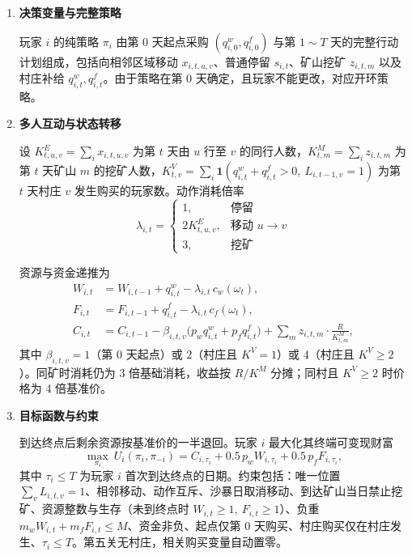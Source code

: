 \documentclass{cumcmthesis}
\numberwithin{equation}{section}
\numberwithin{figure}{section}
\numberwithin{table}{section}
\begin{document}
\begin{enumerate}
    \item \textbf{决策变量与完整策略}
    
\hspace*{2em}玩家 $i$ 的纯策略 $\pi_i$ 由第 0 天起点采购 $(q^w_{i,0},q^f_{i,0})$ 与第 $1\sim T$ 天的完整行动计划组成，包括向相邻区域移动 $x_{i,t,u,v}$、普通停留 $s_{i,t}$、矿山挖矿 $z_{i,t,m}$ 以及村庄补给 $q^w_{i,t},q^f_{i,t}$。由于策略在第 0 天确定，且玩家不能更改，对应开环策略。

    \item \textbf{多人互动与状态转移}

\hspace*{2em}设 $K^E_{t,u,v}=\sum_i x_{i,t,u,v}$ 为第 $t$ 天由 $u$ 行至 $v$ 的同行人数，$K^M_{t,m}=\sum_i z_{i,t,m}$ 为第 $t$ 天矿山 $m$ 的挖矿人数，$K^V_{t,v}=\sum_i\mathbf{1}(q^w_{i,t}+q^f_{i,t}>0,\ L_{i,t-1,v}=1)$ 为第 $t$ 天村庄 $v$ 发生购买的玩家数。动作消耗倍率
\vspace{-10pt}
\begin{equation}
\lambda_{i,t}=\begin{cases}
1, & \text{停留} \\
2K^E_{t,u,v}, & \text{移动 }u\to v \\
3, & \text{挖矿}
\end{cases}
\end{equation}

\hspace*{2em}资源与资金递推为
\vspace{-10pt}
\begin{equation}
\begin{aligned}
W_{i,t}&=W_{i,t-1}+q^w_{i,t}-\lambda_{i,t}\,c_w(\omega_t), \\
F_{i,t}&=F_{i,t-1}+q^f_{i,t}-\lambda_{i,t}\,c_f(\omega_t), \\
C_{i,t}&=C_{i,t-1}-\beta_{i,t,v}\bigl(p_w q^w_{i,t}+p_f q^f_{i,t}\bigr)+\sum_m z_{i,t,m}\cdot\frac{R}{K^M_{t,m}},
\end{aligned}
\end{equation}
其中 $\beta_{i,t,v}=1$（第 0 天起点）或 $2$（村庄且 $K^V=1$）或 $4$（村庄且 $K^V\ge2$）。同矿时消耗仍为 3 倍基础消耗，收益按 $R/K^M$ 分摊；同村且 $K^V\ge2$ 时价格为 4 倍基准价。

    \item \textbf{目标函数与约束}

\hspace*{2em}到达终点后剩余资源按基准价的一半退回。玩家 $i$ 最大化其终端可变现财富
\vspace{-10pt}
\begin{equation}
\max_{\pi_i}\ U_i(\pi_i,\pi_{-i})=C_{i,\tau_i}+0.5\,p_w W_{i,\tau_i}+0.5\,p_f F_{i,\tau_i},
\end{equation}
其中 $\tau_i\le T$ 为玩家 $i$ 首次到达终点的日期。约束包括：唯一位置 $\sum_v L_{i,t,v}=1$、相邻移动、动作互斥、沙暴日取消移动、到达矿山当日禁止挖矿、资源整数与生存（未到终点时 $W_{i,t}\ge1,\ F_{i,t}\ge1$）、负重 $m_w W_{i,t}+m_f F_{i,t}\le M$、资金非负、起点仅第 0 天购买、村庄购买仅在村庄发生、$\tau_i\le T$。第五关无村庄，相关购买变量自动置零。


\end{enumerate}
\end{document}
